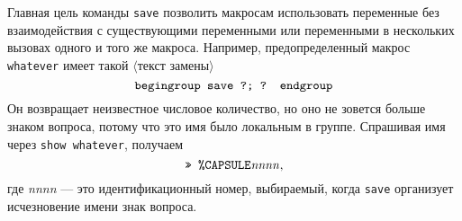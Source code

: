 \documentclass{article} %
\newcommand\invisgap{\nobreak\hskip0pt\relax}
\newcommand\tdescr[1]{$\langle$\invisgap#1\invisgap$\rangle$}
\begin{document}
Главная цель команды {\tt save} позволить макросам использовать 
переменные без взаимодействия с существующими переменными или переменными 
в нескольких вызовах одного и того же макроса.
Например, предопределенный макрос {\tt
whatever} имеет такой \tdescr{текст замены}
$$ \hbox{\tt begingroup save ?; ? endgroup} $$
Он возвращает неизвестное числовое количество, но оно не зовется больше 
знаком вопроса, потому что это имя было локальным в группе.
Спрашивая имя через {\tt show whatever},
получаем
$$ \hbox{\tt >> \%CAPSULE}{\it nnnn}, $$
где {\it nnnn} --- это идентификационный номер, выбираемый, когда {\tt save} 
организует исчезновение имени знак вопроса.
\end{document}
